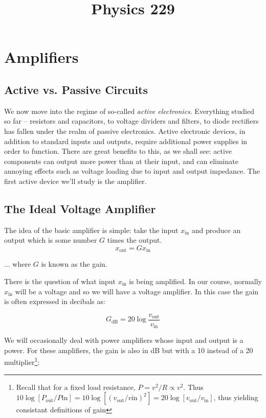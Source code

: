 \documentclass[]{article}
\title{Physics 229}
\begin{document}
\section{Amplifiers}
\subsection{Active vs. Passive Circuits}
We now move into the regime of so-called \textit{active electronics}. Everything studied so far -- resistors and capacitors, to voltage dividers and filters, to diode rectifiers has fallen under the realm of passive electronics. Active electronic devices, in addition to standard inputs and outputs, require additional power supplies in order to function. There are great benefits to this, as we shall see: active components can output more power than at their input, and can eliminate annoying effects such as voltage loading due to input and output impedance. The first active device we'll study is the amplifier.
\subsection{The Ideal Voltage Amplifier}
The idea of the basic amplifier is simple: take the input $x_\text{in}$ and produce an output which is some number $G$ times the output.
\begin{equation}
\label{eq:simple_amp}
x_\text{out} = Gx_\text{in}
\end{equation}

\noindent ... where $G$ is known as the gain.

There is the question of what input $x_\text{in}$ is being amplified. In our course, normally $x_\text{in}$ will be a voltage and so we will have a voltage amplifier. In this case the gain is often expressed in decibals as:

\begin{equation}
\label{eq:voltage_amp_dB}
G_\text{dB} = 20\log\frac{v_\text{out}}{v_\text{in}} 
\end{equation}

We will occasionally deal with power amplifiers whose input and output is a power. For these amplifiers, the gain is also in dB but with a 10 instead of a 20 multiplier\footnote{Recall that for a fixed load resistance, $P = v^2/R \propto v^2$. Thus $10\log\left[P_\text{out}/P\text{in}\right] = 10\log\left[\left(v_\text{out}/v\text{in}\right)^2\right] = 20\log\left[v_\text{out}/v_\text{in}\right]$, thus yielding consistant definitions of gain}:
\end{document}
